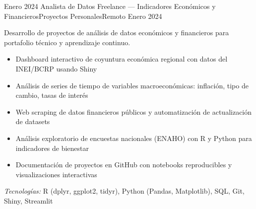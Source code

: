 \experience
{Enero 2024} {Analista de Datos Freelance — Indicadores Económicos y Financieros}{Proyectos Personales}{Remoto}
{Enero 2024} {
	Desarrollo de proyectos de análisis de datos económicos y financieros para portafolio técnico y aprendizaje continuo.
	\begin{itemize}
		\item Dashboard interactivo de coyuntura económica regional con datos del INEI/BCRP usando Shiny
		\item Análisis de series de tiempo de variables macroeconómicas: inflación, tipo de cambio, tasas de interés
		\item Web scraping de datos financieros públicos y automatización de actualización de datasets
		\item Análisis exploratorio de encuestas nacionales (ENAHO) con R y Python para indicadores de bienestar
		\item Documentación de proyectos en GitHub con notebooks reproducibles y visualizaciones interactivas
	\end{itemize}
}
{\footnotesize{\emph{Tecnologías:} R (dplyr, ggplot2, tidyr), Python (Pandas, Matplotlib), SQL, Git, Shiny, Streamlit}}
